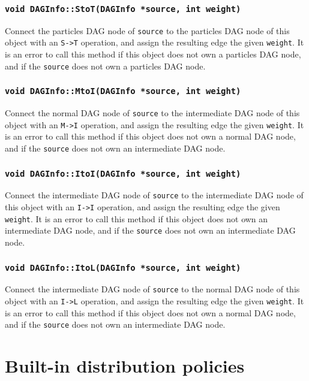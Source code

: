 \subsubsection{\texttt{void DAGInfo::StoT(DAGInfo *source, int weight)}}

Connect the particles DAG node of \texttt{source} to the particles DAG node of
this object with an \texttt{S->T} operation, and assign the resulting edge the
given \texttt{weight}. It is an error to call this method if this object does
not own a particles DAG node, and if the \texttt{source} does not own a
particles DAG node.

\subsubsection{\texttt{void DAGInfo::MtoI(DAGInfo *source, int weight)}}

Connect the normal DAG node of \texttt{source} to the intermediate DAG node of
this object with an \texttt{M->I} operation, and assign the resulting edge the
given \texttt{weight}. It is an error to call this method if this object does
not own a normal DAG node, and if the \texttt{source} does not own an
intermediate DAG node.

\subsubsection{\texttt{void DAGInfo::ItoI(DAGInfo *source, int weight)}}

Connect the intermediate DAG node of \texttt{source} to the intermediate DAG
node of this object with an \texttt{I->I} operation, and assign the resulting
edge the given \texttt{weight}. It is an error to call this method if this
object does not own an intermediate DAG node, and if the \texttt{source} does
not own an intermediate DAG node.

\subsubsection{\texttt{void DAGInfo::ItoL(DAGInfo *source, int weight)}}

Connect the intermediate DAG node of \texttt{source} to the normal DAG
node of this object with an \texttt{I->L} operation, and assign the resulting
edge the given \texttt{weight}. It is an error to call this method if this
object does not own a normal DAG node, and if the \texttt{source} does
not own an intermediate DAG node.


\section{Built-in distribution policies}

